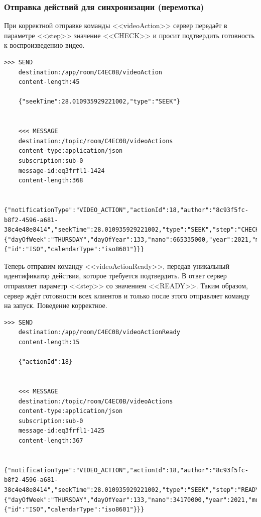 \documentclass{../includes/TechDocMultiAuthors}
\begin{document}
    \subsubsection{Отправка действий для синхронизации (перемотка)}

    При корректной отправке команды <<videoAction>> сервер передаёт в параметре <<step>> значение <<CHECK>> и просит подтвердить готовность к воспроизведению видео.

    \begin{lstlisting}[language=text,caption={Запрос и ответ при отправке действия для синхронизации}]
    >>> SEND
    destination:/app/room/C4EC0B/videoAction
    content-length:45

    {"seekTime":28.010935929221002,"type":"SEEK"}


    <<< MESSAGE
    destination:/topic/room/C4EC0B/videoActions
    content-type:application/json
    subscription:sub-0
    message-id:eq3frfl1-1424
    content-length:368

    {"notificationType":"VIDEO_ACTION","actionId":18,"author":"8c93f5fc-b8f2-4596-a681-38c4e48e8414","seekTime":28.010935929221002,"type":"SEEK","step":"CHECK","actionTime":{"dayOfWeek":"THURSDAY","dayOfYear":133,"nano":665335000,"year":2021,"monthValue":5,"dayOfMonth":13,"hour":23,"minute":45,"second":4,"month":"MAY","chronology":{"id":"ISO","calendarType":"iso8601"}}}
    \end{lstlisting}

    Теперь отправим команду <<videoActionReady>>, передав уникальный идентификатор действия, которое требуется подтвердить.
    В ответ сервер отправляет параметр <<step>> со значением <<READY>>.
    Таким образом, сервер ждёт готовности всех клиентов и только после этого отправляет команду на запуск.
    Поведение корректное.

    \begin{lstlisting}[language=text,caption={Подтверждение готовности воспроизвести видео}]
    >>> SEND
    destination:/app/room/C4EC0B/videoActionReady
    content-length:15

    {"actionId":18}


    <<< MESSAGE
    destination:/topic/room/C4EC0B/videoActions
    content-type:application/json
    subscription:sub-0
    message-id:eq3frfl1-1425
    content-length:367

    {"notificationType":"VIDEO_ACTION","actionId":18,"author":"8c93f5fc-b8f2-4596-a681-38c4e48e8414","seekTime":28.010935929221002,"type":"SEEK","step":"READY","actionTime":{"dayOfWeek":"THURSDAY","dayOfYear":133,"nano":34170000,"year":2021,"monthValue":5,"dayOfMonth":13,"hour":23,"minute":45,"second":5,"month":"MAY","chronology":{"id":"ISO","calendarType":"iso8601"}}}
    \end{lstlisting}

    \registrationList
\end{document}
